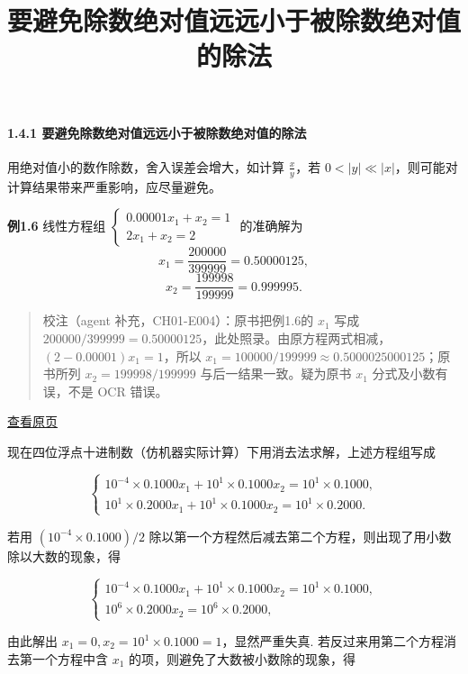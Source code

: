 \documentclass[
  10pt,
  fontset=fandol]{ctexart}
\title{要避免除数绝对值远远小于被除数绝对值的除法}
\author{}
\date{}
\begin{document}
\maketitle

\paragraph{1.4.1 要避免除数绝对值远远小于被除数绝对值的除法}\label{ux8981ux907fux514dux9664ux6570ux7eddux5bf9ux503cux8fdcux8fdcux5c0fux4e8eux88abux9664ux6570ux7eddux5bf9ux503cux7684ux9664ux6cd5}

用绝对值小的数作除数，舍入误差会增大，如计算 \(\frac{x}{y}\)，若 \(0 < |y| \ll |x|\)，则可能对计算结果带来严重影响，应尽量避免。

\textbf{例1.6} 线性方程组 \(\begin{cases} 0.00001x_1 + x_2 = 1 \\ 2x_1 + x_2 = 2 \end{cases}\) 的准确解为 \[
x_1 = \frac{200000}{399999} = 0.50000125,
\] \[
x_2 = \frac{199998}{199999} = 0.999995.
\]

\begin{quote}
校注（agent 补充，CH01-E004）：原书把例1.6的 \(x_1\) 写成 \(200000/399999=0.50000125\)，此处照录。由原方程两式相减，\((2-0.00001)x_1=1\)，所以 \(x_1=100000/199999\approx0.5000025000125\)；原书所列 \(x_2=199998/199999\) 与后一结果一致。疑为原书 \(x_1\) 分式及小数有误，不是 OCR 错误。
\end{quote}

\href{../../source-images/pdf-023.jpeg}{查看原页}

现在四位浮点十进制数（仿机器实际计算）下用消去法求解，上述方程组写成

\[
\begin{cases} 10^{-4} \times 0.1000x_1 + 10^1 \times 0.1000x_2 = 10^1 \times 0.1000, \\ 10^1 \times 0.2000x_1 + 10^1 \times 0.1000x_2 = 10^1 \times 0.2000. \end{cases}
\]

若用 \((10^{-4} \times 0.1000)/2\) 除以第一个方程然后减去第二个方程，则出现了用小数除以大数的现象，得

\[
\begin{cases} 10^{-4} \times 0.1000x_1 + 10^1 \times 0.1000x_2 = 10^1 \times 0.1000, \\ 10^6 \times 0.2000x_2 = 10^6 \times 0.2000, \end{cases}
\]

由此解出 \(x_1=0, x_2=10^1 \times 0.1000=1\)，显然严重失真. 若反过来用第二个方程消去第一个方程中含 \(x_1\) 的项，则避免了大数被小数除的现象，得
\end{document}
